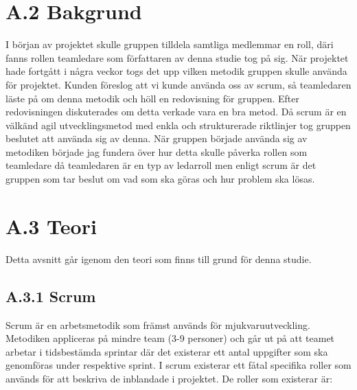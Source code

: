 \section{A.2 Bakgrund}
I början av projektet skulle gruppen tilldela samtliga medlemmar en roll, däri fanns rollen teamledare som författaren av denna studie tog på sig. När projektet hade fortgått i några veckor togs det upp vilken metodik gruppen skulle använda för projektet. Kunden föreslog att vi kunde använda oss av scrum, så teamledaren läste på om denna metodik och höll en redovisning för gruppen. Efter redovisningen diskuterades om detta verkade vara en bra metod. Då scrum är en välkänd agil utvecklingsmetod med enkla och strukturerade riktlinjer tog gruppen beslutet att använda sig av denna. När gruppen började använda sig av metodiken började jag fundera över hur detta skulle påverka rollen som teamledare då teamledaren är en typ av ledarroll men enligt scrum är det gruppen som tar beslut om vad som ska göras och hur problem ska lösas.

\section{A.3 Teori}
Detta avsnitt går igenom den teori som finns till grund för denna studie.

\subsection{A.3.1 Scrum} \label{adam_scrum}
Scrum är en arbetsmetodik som främst används för mjukvaruutveckling. Metodiken appliceras på mindre team (3-9 personer) och går ut på att teamet arbetar i tidsbestämda sprintar där det existerar ett antal uppgifter som ska genomföras under respektive sprint.
I scrum existerar ett fåtal specifika roller som används för att beskriva de inblandade i projektet. De roller som existerar är:


